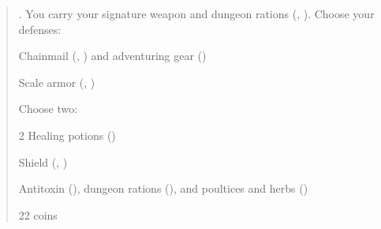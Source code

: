 \documentclass[8pt]{extarticle}
\begin{document}
\begin{multicols}{2}

  \begin{quote}

    . You carry your signature weapon and dungeon rations
    (, ). Choose your defenses:

    \begin{choices}
    \item Chainmail (, ) and
      adventuring gear ()
    \item Scale armor (, )
    \end{choices}

    Choose two:

    \begin{choices}
    \item 2 Healing potions ()
    \item Shield (, )
    \item Antitoxin (), dungeon rations
      (), and poultices and herbs ()
    \item 22 coins
    \end{choices}

\end{quote}

\ 

\columnbreak

\ 

\end{multicols}

\end{document}
